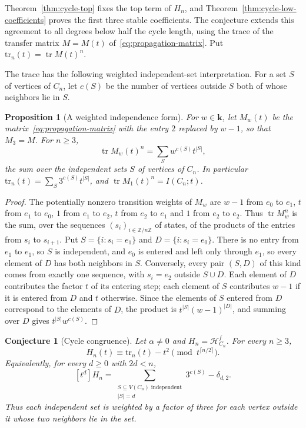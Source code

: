 \documentclass[reqno]{article}
\theoremstyle{plain} %
\newtheorem{proposition}[theorem]{Proposition}
\newtheorem{conjecture}[theorem]{Conjecture}
\theoremstyle{definition}
\theoremstyle{remark}
\newcommand{\Z}{{\mathbb{Z}}}
\newcommand{\K} {\mathbf{k}}
\newcommand{\hs}{\mathscr{H}}
\numberwithin{equation}{section}
\begin{document}
Theorem~\ref{thm:cycle-top} fixes the top term of $H_n$, and
Theorem~\ref{thm:cycle-low-coefficients} proves the first three stable
coefficients. The conjecture extends this agreement to all degrees below
half the cycle length, using the trace of the transfer matrix
$M=M(t)$ of~\eqref{eq:propagation-matrix}. Put
$\mathrm{tr}_n(t)=\operatorname{tr}M(t)^n$.

The trace has the following weighted independent-set interpretation. For a set $S$ of vertices
of $C_n$, let $c(S)$ be the number of vertices outside $S$ both of whose
neighbors lie in $S$.

\begin{proposition}[A weighted independence form]
\label{prop:cycle-weighted-independence}
For $w\in\K$, let $M_w(t)$ be the matrix~\eqref{eq:propagation-matrix}
with the entry $2$ replaced by $w-1$, so that $M_3=M$. For $n\ge3$,
\[
 \operatorname{tr}M_w(t)^n=\sum_{S}w^{c(S)}t^{|S|},
\]
the sum over the independent sets $S$ of vertices of $C_n$. In
particular $\mathrm{tr}_n(t)=\sum_S3^{c(S)}t^{|S|}$, and
$\operatorname{tr}M_1(t)^n=I(C_n;t)$.
\end{proposition}
\begin{proof}
The potentially nonzero transition weights of $M_w$ are $w-1$ from $e_0$ to $e_1$, $t$
from $e_1$ to $e_0$, $1$ from $e_1$ to $e_2$, $t$ from $e_2$ to $e_1$
and $1$ from $e_2$ to $e_2$. Thus $\operatorname{tr}M_w^n$ is the sum,
over the sequences $(s_i)_{i\in\Z/n\Z}$ of states, of the products of the
entries from $s_i$ to $s_{i+1}$. Put $S=\{i:s_i=e_1\}$ and
$D=\{i:s_i=e_0\}$. There is no entry from $e_1$ to $e_1$, so $S$ is
independent, and $e_0$ is entered and left only through $e_1$, so every
element of $D$ has both neighbors in $S$. Conversely, every pair $(S,D)$
of this kind comes from exactly one sequence, with $s_i=e_2$ outside
$S\cup D$. Each element of $D$ contributes the factor $t$ of its
entering step; each element of $S$ contributes $w-1$ if it is entered
from $D$ and $t$ otherwise. Since the elements of $S$ entered from $D$
correspond to the elements of $D$, the product is
$t^{|S|}(w-1)^{|D|}$, and summing over $D$ gives $t^{|S|}w^{c(S)}$.
\end{proof}

\begin{conjecture}[Cycle congruence]
\label{conj:cycles}
Let $\alpha\ne0$ and $H_n=\hs^f_{C_n}$. For every $n\ge3$,
\begin{equation}\label{eq:cycle-stable-congruence}
H_n(t)\equiv \mathrm{tr}_n(t)-t^2\pmod{t^{\lceil n/2\rceil}}.
\end{equation}
Equivalently, for every $d\ge0$ with $2d<n$,
\[
 [t^d]H_n=\sum_{\substack{S\subseteq V(C_n)\text{ independent}\\|S|=d}}
            3^{c(S)}-\delta_{d,2}.
\]
Thus each independent set is weighted by a factor of three for each
vertex outside it whose two neighbors lie in the set.
\end{conjecture}
\end{document}
